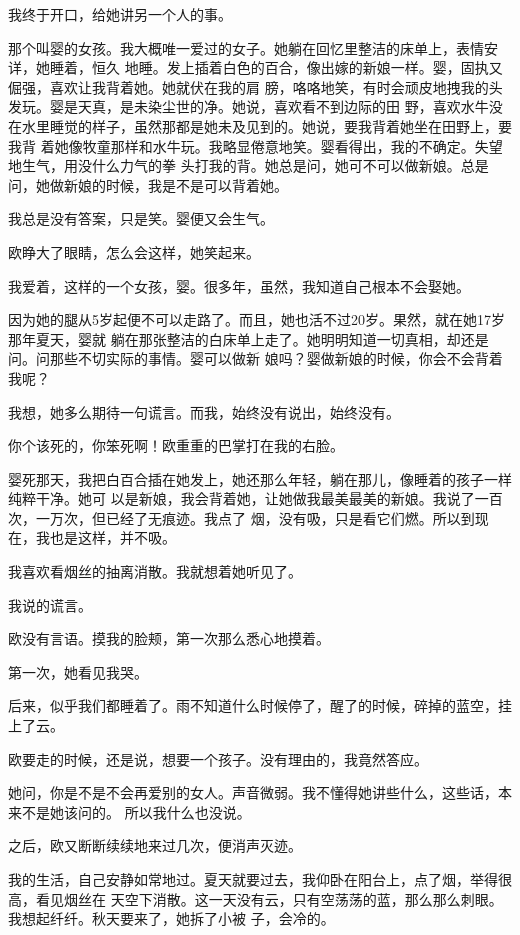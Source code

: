 		我终于开口，给她讲另一个人的事。

		那个叫婴的女孩。我大概唯一爱过的女子。她躺在回忆里整洁的床单上，表情安详，她睡着，恒久
	地睡。发上插着白色的百合，像出嫁的新娘一样。婴，固执又倔强，喜欢让我背着她。她就伏在我的肩
	膀，咯咯地笑，有时会顽皮地拽我的头发玩。婴是天真，是未染尘世的净。她说，喜欢看不到边际的田
	野，喜欢水牛没在水里睡觉的样子，虽然那都是她未及见到的。她说，要我背着她坐在田野上，要我背
	着她像牧童那样和水牛玩。我略显倦意地笑。婴看得出，我的不确定。失望地生气，用没什么力气的拳
	头打我的背。她总是问，她可不可以做新娘。总是问，她做新娘的时候，我是不是可以背着她。

		我总是没有答案，只是笑。婴便又会生气。\par
		欧睁大了眼睛，怎么会这样，她笑起来。\par
		我爱着，这样的一个女孩，婴。很多年，虽然，我知道自己根本不会娶她。

		因为她的腿从5岁起便不可以走路了。而且，她也活不过20岁。果然，就在她17岁那年夏天，婴就
	躺在那张整洁的白床单上走了。她明明知道一切真相，却还是问。问那些不切实际的事情。婴可以做新
	娘吗？婴做新娘的时候，你会不会背着我呢？

		我想，她多么期待一句谎言。而我，始终没有说出，始终没有。\par
		你个该死的，你笨死啊！欧重重的巴掌打在我的右脸。

		婴死那天，我把白百合插在她发上，她还那么年轻，躺在那儿，像睡着的孩子一样纯粹干净。她可
	以是新娘，我会背着她，让她做我最美最美的新娘。我说了一百次，一万次，但已经了无痕迹。我点了
	烟，没有吸，只是看它们燃。所以到现在，我也是这样，并不吸。

		我喜欢看烟丝的抽离消散。我就想着她听见了。\par
		我说的谎言。\par
		欧没有言语。摸我的脸颊，第一次那么悉心地摸着。\par
		第一次，她看见我哭。\par
		后来，似乎我们都睡着了。雨不知道什么时候停了，醒了的时候，碎掉的蓝空，挂上了云。\par
		欧要走的时候，还是说，想要一个孩子。没有理由的，我竟然答应。

		她问，你是不是不会再爱别的女人。声音微弱。我不懂得她讲些什么，这些话，本来不是她该问的。
	所以我什么也没说。

		之后，欧又断断续续地来过几次，便消声灭迹。


		我的生活，自己安静如常地过。夏天就要过去，我仰卧在阳台上，点了烟，举得很高，看见烟丝在
	天空下消散。这一天没有云，只有空荡荡的蓝，那么那么刺眼。我想起纤纤。秋天要来了，她拆了小被
	子，会冷的。


